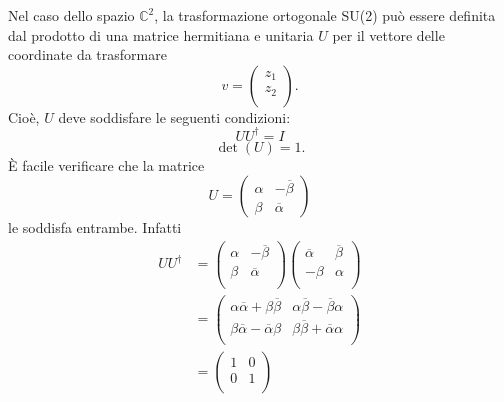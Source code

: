 \documentclass[fleqn,italian]{article}
\theoremstyle{definition}
\theoremstyle{remark}
\theoremstyle{plain}%
\theoremstyle{definition}
\theoremstyle{remark}
\numberwithin{equation}{section}
\numberwithin{thm}{section}
\begin{document}
Nel caso dello spazio $\mathbb{C}^2$, la trasformazione ortogonale
SU(2) pu\`o essere definita dal prodotto di una matrice hermitiana
e unitaria $U$ per il vettore delle coordinate da trasformare 
\begin{equation}
v=\begin{pmatrix} z_1 \\ z_2 \\ \end{pmatrix}.
\end{equation}
Cio\`e, $U$ deve soddisfare le seguenti condizioni:
\begin{equation}
U U^\dagger = I
\end{equation}
\begin{equation}
\det(U)=1.
\end{equation}
\`E facile verificare che la matrice
\begin{equation}
U=\begin{pmatrix} \alpha & -\overline{\beta} \\ \beta & \overline{\alpha}
  \end{pmatrix}
\end{equation}
le soddisfa entrambe. Infatti
\begin{equation}
\begin{split}
U U^\dagger 
   & = \begin{pmatrix} \alpha & -\overline{\beta} \\ 
                  \beta   &  \overline{\alpha} \\ \end{pmatrix}
     \begin{pmatrix} \overline{\alpha} & \overline{\beta} \\ 
               -\beta   &  \alpha \\ \end{pmatrix} \\
   & = \begin{pmatrix} \alpha\overline{\alpha}+\beta\overline{\beta} &
                \alpha\overline{\beta}-\overline{\beta}\alpha \\
                \beta\overline{\alpha}-\overline{\alpha}\beta & 
                \beta\overline{\beta}+\overline{\alpha}\alpha \\
                \end{pmatrix} \\
   & = \begin{pmatrix} 1 & 0 \\ 0 & 1 \\ \end{pmatrix}
\end{split}
\end{equation}
\end{document}
